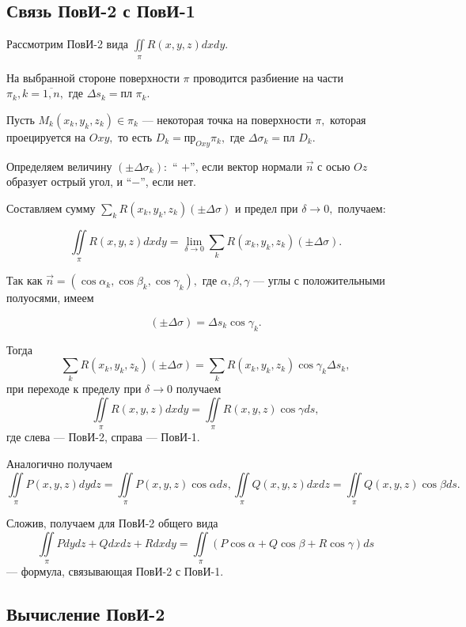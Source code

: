 \documentclass[../../main.tex]{subfiles}
\begin{document}
\subsection{Связь ПовИ-2 с ПовИ-1}

Рассмотрим ПовИ-2 вида $\iint\limits_\pi R(x, y, z)dxdy.$

На выбранной стороне поверхности $\pi$ проводится разбиение на части $\pi_k,
 k=\overline{1,n},$ где $\Delta s_k =\text{пл }\pi_k.$

Пусть $M_k(x_k, y_k, z_k)\in\pi_k$ --- некоторая точка на поверхности $\pi,$ 
которая проецируется на $Oxy,$ то есть $D_k = \text{пр}_{Oxy} \pi_k,$ где
 $\Delta\sigma_k = \text{пл }D_k.$

Определяем величину $(\pm\Delta\sigma_k):$ \textquotedblleft 
$+$\textquotedblright, если вектор нормали $\vec{n}$ с осью $Oz$ образует
 острый угол, и \textquotedblleft $-$\textquotedblright, если нет.

Составляем сумму $\sum\limits_k R(x_k, y_k, z_k)(\pm\Delta\sigma)$ и предел
 при $\delta\rightarrow 0,$
  получаем:

\[\iint\limits_\pi R(x, y, z)dxdy = \lim_{\delta\rightarrow 0}\sum\limits_k 
R(x_k, y_k, z_k)(\pm \Delta\sigma).\]

Так как $\vec{n}=(\cos\alpha_k, \cos\beta_k, \cos\gamma_k),$ где $\alpha, 
\beta, \gamma$ --- углы с положительными полуосями, имеем

\[(\pm\Delta\sigma) = \Delta s_k\cos\gamma_k.\]

Тогда 
\[\sum\limits_k R(x_k, y_k, z_k)(\pm \Delta\sigma) = \sum\limits_k 
 R(x_k, y_k, z_k) \cos\gamma_k \Delta s_k,\]
при переходе к пределу при $\delta\rightarrow 0$ получаем
\[\iint\limits_\pi R(x, y, z)dxdy = \iint\limits_\pi R(x, y, z) 
\cos\gamma ds,\] где слева --- ПовИ-2, справа --- ПовИ-1.

Аналогично получаем \[\iint\limits_\pi P(x, y, z)dydz = \iint\limits_\pi 
P(x, y, z) \cos\alpha ds, \iint\limits_\pi Q(x, y, z)dxdz = \iint\limits_\pi
 Q(x, y, z) \cos\beta ds.\]

Сложив, получаем для ПовИ-2 общего вида
\begin{equation}\label{lec24, num_1}\iint\limits_\pi Pdydz + Qdxdz + Rdxdy = 
\iint\limits_\pi(P\cos\alpha + Q\cos\beta + R\cos\gamma)ds\end{equation} ---
 формула, связывающая ПовИ-2 с ПовИ-1.

\subsection{Вычисление ПовИ-2}
\end{document}
